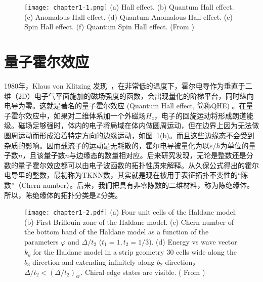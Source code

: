 \begin{figure}[!htbp]
    \centering
    \texttt{[image: chapter1-1.png]}
    {(a) Hall effect.  (b) Quantum Hall effect. (c) Anomalous Hall effect. (d) Quantum Anomalous Hall effect.  (e) Spin Hall effect. (f) Quantum Spin Hall effect. (From \cite{review-arxiv})}
    \label{fig:1-1}
\end{figure}

\section{量子霍尔效应}
1980年，Klaus von Klitzing 发现~\citep{Klitzing1980}，在非常低的温度下，霍尔电导作为垂直于二维（2D）电子气平面施加的磁场强度的函数，会出现量化的阶梯平台，同时纵向电导为零。这就是著名的量子霍尔效应 (Quantum Hall effect, 简称QHE) 。在量子霍尔效应中，如果对二维体系加一个外磁场$H_z$，电子的回旋运动将形成朗道能级。磁场足够强时，体内的电子将局域在体内做圆周运动，但在边界上因为无法做圆周运动而形成沿着特定方向的边缘运动，如图~\ref{fig:1-1}(b)。而且这些边缘态不会受到杂质的影响。因而载流子的运动是无耗散的，霍尔电导被量化为以$e/h$为单位的量子数$n$，且该量子数$n$与边缘态的数量相对应。后来研究发现，无论是整数还是分数的量子霍尔效应都可以由电子波函数的拓扑性质来解释\citep{Laughlin1981,TKNN1982}。从久保公式得出的霍尔电导里的整数，最初称为TKNN数，其实就是现在被用于表征拓扑不变性的“陈数”（Chern number）。后来，我们把具有非零陈数的二维材料，称为陈绝缘体。所以，陈绝缘体的拓扑分类是$\mathbb{Z}$分类。
\begin{figure}[!htbp]
    \centering
    \texttt{[image: chapter1-2.pdf]}
    {(a) Four unit cells of the Haldane model. (b) First Brillouin zone of the Haldane model. (c) Chern number of the bottom band of the Haldane model as a function of the parameters $\varphi$ and $\Delta/ t_2$ ($t_1=1, t_2=1/3$). (d) Energy vs wave vector $k_y$ for the Haldane model in a
    strip geometry 30 cells wide along the $b_3$ direction and extending infinitely along $b_2$ direction，$\Delta/t_2 <(\Delta/t_2)_{cr}$. Chiral edge states are visible. ( From \cite{Haldane2})}
    \label{fig:1-2}
\end{figure}

